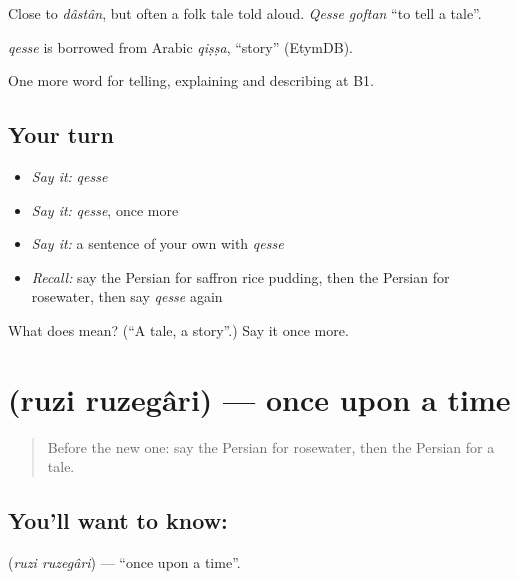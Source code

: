 Close to \emph{dâstân}, but often a folk tale told aloud. \emph{Qesse goftan} \textquotedblleft{}to tell a tale\textquotedblright{}.

\begin{cousinweb}
\emph{qesse} is borrowed from Arabic \emph{qiṣṣa}, \textquotedblleft{}story\textquotedblright{} (EtymDB).
\end{cousinweb}

\begin{grammarlens}[title={What you've built}]
One more word for telling, explaining and describing at B1.
\end{grammarlens}

\subsection*{Your turn}
\begin{itemize}
\raggedright
  \item \emph{Say it:} \emph{qesse}
  \item \emph{Say it:} \emph{qesse}, once more
  \item \emph{Say it:} a sentence of your own with \emph{qesse}
  \item \emph{Recall:} say the Persian for saffron rice pudding, then the Persian for rosewater, then say \emph{qesse} again
\end{itemize}

\begin{tcolorbox}[breakable,colback=teal!4,colframe=teal!35!black,title={Before you move on}]
What does  mean? (\textquotedblleft{}A tale, a story\textquotedblright{}.) Say it once more.
\end{tcolorbox}
\section[\texorpdfstring{\fa{روزی} \fa{روزگاری} (ruzi ruzegâri)}{روزی روزگاری (ruzi ruzegâri)}]{  (ruzi ruzegâri) — once upon a time}

\label{lesson:FA-C345-ruzi-ruzegari}



\begin{quote}
Before the new one: say the Persian for rosewater, then the Persian for a tale.
\end{quote}

\subsection*{You'll want to know:  }
\textbf{ } (\emph{ruzi ruzegâri}) — \textquotedblleft{}once upon a time\textquotedblright{}.

